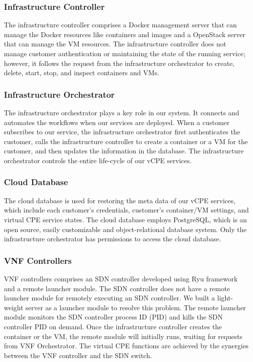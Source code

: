 \subsubsection{Infrastructure Controller}
The infrastructure controller comprises a Docker management server that can manage the Docker resources like containers and images and a OpenStack server that can manage the VM resources. The infrastructure controller does not manage customer authentication or maintaining the state of the running service; however, it follows the request from the infrastructure orchestrator to create, delete, start, stop, and inspect containers and VMs.

\subsubsection{Infrastructure Orchestrator}
The infrastructure orchestrator plays a key role in our system. It connects and automates the workflows when our services are deployed. When a customer subscribes to our service, the infrastructure orchestrator first authenticates the customer, calls the infrastructure controller to create a container or a VM for the customer, and then updates the information in the database. The infrastructure orchestrator controls the entire life-cycle of our vCPE services.

\subsubsection{Cloud Database}
The cloud database is used for restoring the meta data of our vCPE services, which include each customer’s credentials, customer’s container/VM settings, and virtual CPE service states. The cloud database employs PostgreSQL, which is an open source, easily customizable and object-relational database system. Only the infrastructure orchestrator has permissions to access the cloud database.

\subsubsection{VNF Controllers}
VNF controllers comprises an SDN controller developed using Ryu framework \cite{ryu} and a remote launcher module. The SDN controller does not have a remote launcher module for remotely executing an SDN controller. We built a light-weight server as a launcher module to resolve this problem. The remote launcher module monitors the SDN controller process ID (PID) and kills the SDN controller PID on demand. Once the infrastructure controller  creates the container or the VM, the remote module will initially runs, waiting for requests from VNF Orchestrator. The virtual CPE functions are achieved by the synergies between the VNF controller and the SDN switch.

